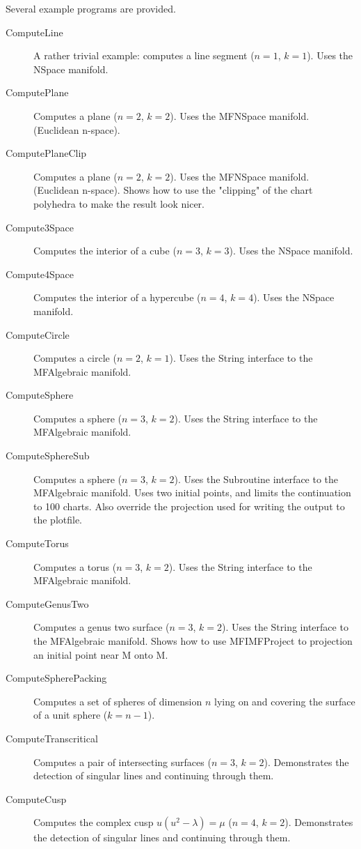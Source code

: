 \documentclass[12pt]{article}
\begin{document}
Several example programs are provided.
\begin{description}
  \item[ComputeLine]
     A rather trivial example: computes a line segment ($n=1$, $k=1$).
     Uses the NSpace manifold.
  \item[ComputePlane]
     Computes a plane ($n=2$, $k=2$).
     Uses the MFNSpace manifold. (Euclidean n-space).
  \item[ComputePlaneClip]
     Computes a plane ($n=2$, $k=2$).
     Uses the MFNSpace manifold. (Euclidean n-space).
     Shows how to use the "clipping" of the chart polyhedra to make the result look nicer.
  \item[Compute3Space]
     Computes the interior of a cube ($n=3$, $k=3$).
     Uses the NSpace manifold.
  \item[Compute4Space]
     Computes the interior of a hypercube ($n=4$, $k=4$).
     Uses the NSpace manifold.
  \item[ComputeCircle]
     Computes a circle ($n=2$, $k=1$).
     Uses the String interface to the MFAlgebraic manifold.
  \item[ComputeSphere]
     Computes a sphere ($n=3$, $k=2$).
     Uses the String interface to the MFAlgebraic manifold.
  \item[ComputeSphereSub]
     Computes a sphere ($n=3$, $k=2$).
     Uses the Subroutine interface to the MFAlgebraic manifold.
     Uses two initial points, and limits the continuation to 100 charts.
     Also override the projection used for writing the output to the plotfile.
  \item[ComputeTorus]
     Computes a torus ($n=3$, $k=2$).
     Uses the String interface to the MFAlgebraic manifold.
  \item[ComputeGenusTwo]
     Computes a genus two surface ($n=3$, $k=2$).
     Uses the String interface to the MFAlgebraic manifold.
     Shows how to use MFIMFProject to projection an initial point near M onto M.
  \item[ComputeSpherePacking]
     Computes a set of spheres of dimension $n$ lying on and covering the surface of a unit sphere ($k=n-1$).
  \item[ComputeTranscritical]
     Computes a pair of intersecting surfaces ($n=3$, $k=2$). Demonstrates the detection of singular lines and 
     continuing through them.
  \item[ComputeCusp]
     Computes the complex cusp $u(u^2-\lambda)=\mu$ ($n=4$, $k=2$). Demonstrates the detection of singular lines and 
     continuing through them.

\end{description}
\end{document}
